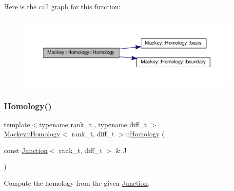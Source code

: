 Here is the call graph for this function\+:\nopagebreak
\begin{figure}[H]
\begin{center}
\leavevmode
\includegraphics[width=350pt]{classMackey_1_1Homology_a3580b194f986bd59a02fb84db97e00f2_cgraph}
\end{center}
\end{figure}
\mbox{\label{classMackey_1_1Homology_a31e26f0fb8e1cd7f0506ae1dbc97ea22}} 
\subsubsection{\texorpdfstring{Homology()}{Homology()}\hspace{0.1cm}{\footnotesize\ttfamily [2/3]}}
{\footnotesize\ttfamily template$<$typename rank\+\_\+t , typename diff\+\_\+t $>$ \\
\hyperlink{classMackey_1_1Homology}{Mackey\+::\+Homology}$<$ rank\+\_\+t, diff\+\_\+t $>$\+::\hyperlink{classMackey_1_1Homology}{Homology} (\begin{DoxyParamCaption}\item[{const \hyperlink{classMackey_1_1Junction}{Junction}$<$ rank\+\_\+t, diff\+\_\+t $>$ \&}]{J }\end{DoxyParamCaption})}



Compute the homology from the given \hyperlink{classMackey_1_1Junction}{Junction}. 

\mbox{\label{classMackey_1_1Homology_af42f480509ef68df47308c0f506d44c8}} 
